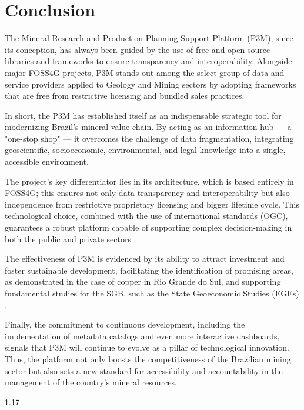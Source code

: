 \documentclass{isprs} %
\begin{document}
\section{Conclusion}\label{CONCLUSION}

The Mineral Research and Production Planning Support Platform (P3M), since its conception, has always been guided by the use of free and open-source libraries and frameworks to ensure transparency and interoperability. Alongside major FOSS4G projects, P3M stands out among the select group of data and service providers applied to Geology and Mining sectors by adopting frameworks that are free from restrictive licensing and bundled sales practices.

In short, the P3M has established itself as an indispensable strategic tool for modernizing Brazil's mineral value chain. By acting as an information hub — a "one-stop shop" — it overcomes the challenge of data fragmentation, integrating geoscientific, socioeconomic, environmental, and legal knowledge into a single, accessible environment.

The project's key differentiator lies in its architecture, which is based entirely in FOSS4G; this ensures not only data transparency and interoperability but also independence from restrictive proprietary licensing and bigger lifetime cycle. This technological choice, combined with the use of international standards (OGC), guarantees a robust platform capable of supporting complex decision-making in both the public and private sectors \cite{carli2024}.

The effectiveness of P3M is evidenced by its ability to attract investment and foster sustainable development, facilitating the identification of promising areas, as demonstrated in the case of copper in Rio Grande do Sul, and supporting fundamental studies for the SGB, such as the State Geoeconomic Studies (EGEs) \cite{sgb_economia_mineral}.

Finally, the commitment to continuous development, including the implementation of metadata catalogs and even more interactive dashboards, signals that P3M will continue to evolve as a pillar of technological innovation. Thus, the platform not only boosts the competitiveness of the Brazilian mining sector but also sets a new standard for accessibility and accountability in the management of the country's mineral resources.


{
	\begin{spacing}{1.17}
		\normalsize
	\end{spacing}
}
\end{document}
